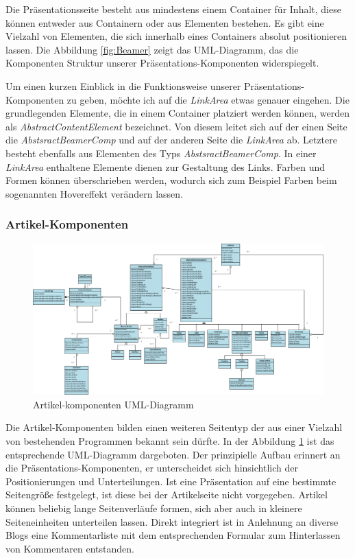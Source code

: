 \documentclass[12pt]{article}
\begin{document}
Die Präsentationsseite besteht aus mindestens einem Container für Inhalt, diese können entweder aus Containern oder aus Elementen bestehen.
Es gibt eine Vielzahl von Elementen, die sich innerhalb eines Containers absolut positionieren lassen. Die Abbildung \ref{fig:Beamer} zeigt
das UML-Diagramm, das die Komponenten Struktur unserer Präsentations-Komponenten widerspiegelt. 

Um einen kurzen Einblick in die Funktionsweise unserer Präsentations-Komponenten zu geben, möchte ich auf die \textit{LinkArea} etwas genauer eingehen. 
Die grundlegenden Elemente, die in einem Container platziert werden können, werden als \textit{AbstractContentElement} bezeichnet. Von diesem leitet sich auf der einen Seite die \textit{AbstsractBeamerComp} und auf der anderen Seite die \textit{LinkArea} ab. 
Letztere besteht ebenfalls aus Elementen des Typs \textit{AbstsractBeamerComp}. 
In einer \textit{LinkArea} enthaltene Elemente dienen zur Gestaltung des Links. Farben und Formen
können überschrieben werden, wodurch sich zum Beispiel Farben beim sogenannten Hovereffekt verändern lassen.

\subsubsection{Artikel-Komponenten}

\begin{figure}[h]
	\centering
	\includegraphics[width=1.0\textwidth]{Artikel.png}
	\caption{Artikel-komponenten UML-Diagramm}
	\label{fig:Artikel}
\end{figure}

Die Artikel-Komponenten bilden einen weiteren Seitentyp der aus einer Vielzahl von bestehenden Programmen
bekannt sein dürfte. In der Abbildung \ref{fig:Artikel} ist das entsprechende UML-Diagramm dargeboten.
Der prinzipielle Aufbau erinnert an die Präsentations-Komponenten, er unterscheidet sich hinsichtlich
der Positionierungen und Unterteilungen. Ist eine Präsentation auf eine bestimmte Seitengröße festgelegt, ist diese bei der Artikelseite
nicht vorgegeben. Artikel können beliebig lange Seitenverläufe formen, sich aber auch in kleinere Seiteneinheiten unterteilen lassen.
Direkt integriert ist in Anlehnung an diverse Blogs eine Kommentarliste mit dem entsprechenden Formular zum Hinterlassen
von Kommentaren entstanden.
\end{document}

